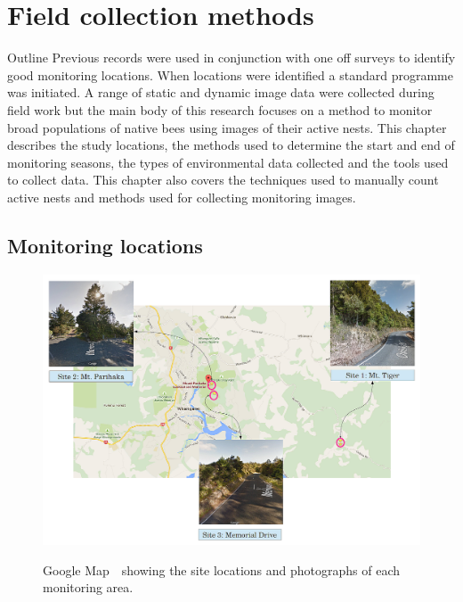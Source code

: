 \chapter{Field collection methods}\label{sec:field-collection-methods}
\begin{remark}{Outline}
Previous records were used in conjunction with one off surveys to identify good monitoring locations. When locations were identified a standard programme was initiated. A range of static and dynamic image data were collected during field work but the main body of this research focuses on a method to monitor broad populations of native bees using images of their active nests. This chapter describes the study locations, the methods used to determine the start and end of monitoring seasons, the types of environmental data collected and the tools used to collect data. This chapter also covers the techniques used to manually count active nests and methods used for collecting monitoring images.
\end{remark}

\section{Monitoring locations}\label{sec:monitoring-locations}

\begin{figure}\myfloatalign
\includegraphics[width=0.9\linewidth]{gfx4/map1} \\
\caption[Study locations.]{Google Map~\textcopyright~showing the site locations and photographs of each monitoring area. }\label{fig:locations-map}
\end{figure}


